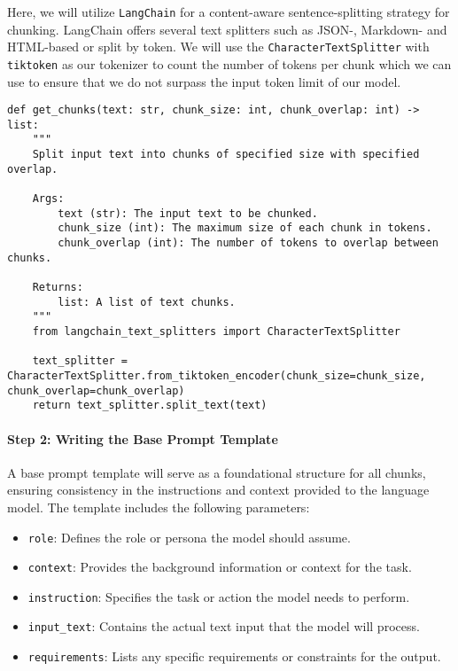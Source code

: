 Here, we will utilize \texttt{LangChain} for a content-aware sentence-splitting strategy for chunking. LangChain offers several text splitters  such as JSON-, Markdown- and HTML-based or split by token. We will use the \texttt{CharacterTextSplitter} with \texttt{tiktoken} as our tokenizer to count the number of tokens per chunk which we can use to ensure that we do not surpass the input token limit of our model.
\begin{verbatim}
def get_chunks(text: str, chunk_size: int, chunk_overlap: int) -> list:
    """
    Split input text into chunks of specified size with specified overlap.

    Args:
        text (str): The input text to be chunked.
        chunk_size (int): The maximum size of each chunk in tokens.
        chunk_overlap (int): The number of tokens to overlap between chunks.

    Returns:
        list: A list of text chunks.
    """
    from langchain_text_splitters import CharacterTextSplitter

    text_splitter = CharacterTextSplitter.from_tiktoken_encoder(chunk_size=chunk_size, chunk_overlap=chunk_overlap)
    return text_splitter.split_text(text)
\end{verbatim}

\paragraph{Step 2: Writing the Base Prompt Template}

A base prompt template will serve as a foundational structure for all chunks, ensuring consistency in the instructions and context provided to the language model. The template includes the following parameters:

\begin{itemize}
\item \texttt{role}: Defines the role or persona the model should assume.
\item \texttt{context}: Provides the background information or context for the task.
\item \texttt{instruction}: Specifies the task or action the model needs to perform.
\item \texttt{input\_text}: Contains the actual text input that the model will process.
\item \texttt{requirements}: Lists any specific requirements or constraints for the output.
\end{itemize}

